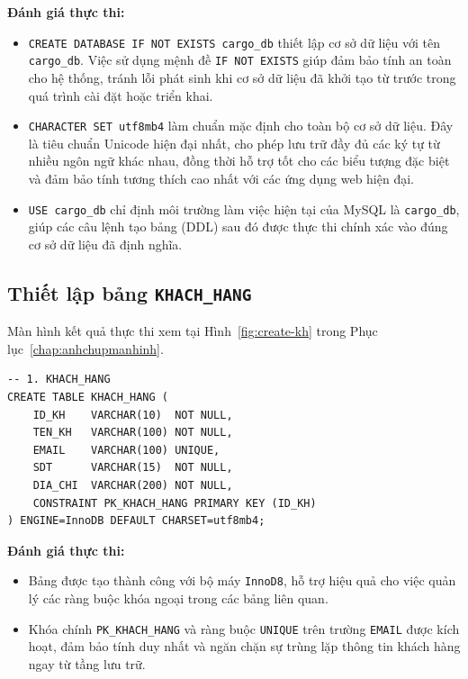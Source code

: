 \documentclass[11pt]{report}
\begin{document}
\textbf{Đánh giá thực thi:}
\begin{itemize}
    \item \texttt{CREATE DATABASE IF NOT EXISTS cargo\_db} thiết lập cơ sở dữ liệu với tên \texttt{cargo\_db}. Việc sử dụng mệnh đề \texttt{IF NOT EXISTS} giúp đảm bảo tính an toàn cho hệ thống, tránh lỗi phát sinh khi cơ sở dữ liệu đã khởi tạo từ trước trong quá trình cài đặt hoặc triển khai.
    
    \item \texttt{CHARACTER SET utf8mb4} làm chuẩn mặc định cho toàn bộ cơ sở dữ liệu. Đây là tiêu chuẩn Unicode hiện đại nhất, cho phép lưu trữ đầy đủ các ký tự từ nhiều ngôn ngữ khác nhau, đồng thời hỗ trợ tốt cho các biểu tượng đặc biệt và đảm bảo tính tương thích cao nhất với các ứng dụng web hiện đại.
    
    \item \texttt{USE cargo\_db} chỉ định môi trường làm việc hiện tại của MySQL là \texttt{cargo\_db}, giúp các câu lệnh tạo bảng (DDL) sau đó được thực thi chính xác vào đúng cơ sở dữ liệu đã định nghĩa.
\end{itemize}

\subsection{Thiết lập bảng \texttt{KHACH\_HANG}}

Màn hình kết quả thực thi xem tại Hình~\ref{fig:create-kh} trong Phục lục~\ref{chap:anhchupmanhinh}.

\begin{verbatim}
-- 1. KHACH_HANG
CREATE TABLE KHACH_HANG (
    ID_KH    VARCHAR(10)  NOT NULL,
    TEN_KH   VARCHAR(100) NOT NULL,
    EMAIL    VARCHAR(100) UNIQUE,
    SDT      VARCHAR(15)  NOT NULL,
    DIA_CHI  VARCHAR(200) NOT NULL,
    CONSTRAINT PK_KHACH_HANG PRIMARY KEY (ID_KH)
) ENGINE=InnoDB DEFAULT CHARSET=utf8mb4;
\end{verbatim}    

\textbf{Đánh giá thực thi:}
\begin{itemize}
    \item Bảng được tạo thành công với bộ máy \texttt{InnoD8}, hỗ trợ hiệu quả cho việc quản lý các ràng buộc khóa ngoại trong các bảng liên quan.
    
    \item Khóa chính \texttt{PK\_KHACH\_HANG} và ràng buộc \texttt{UNIQUE} trên trường \texttt{EMAIL} được kích hoạt, đảm bảo tính duy nhất và ngăn chặn sự trùng lặp thông tin khách hàng ngay từ tầng lưu trữ.
\end{itemize}
\end{document}
